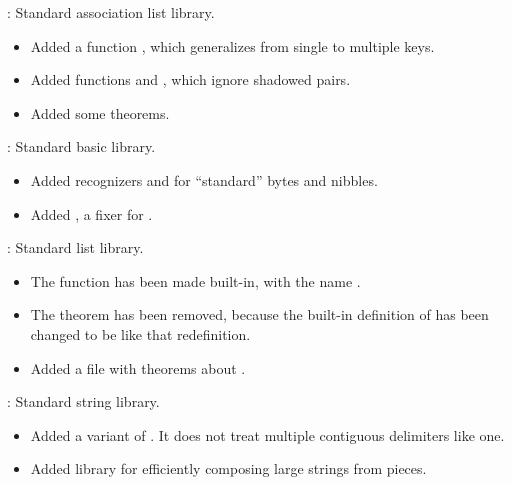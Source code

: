 \begin{frame}

\implibtitle

:
Standard association list library.
\begin{itemize}
\item
Added a function ,
which generalizes  from single to multiple keys.
\item
Added functions  and ,
which ignore shadowed pairs.
\item
Added some theorems.
\end{itemize}

\separation

:
Standard basic library.
\begin{itemize}
\item
Added recognizers  and 
for ``standard'' bytes and nibbles.
\item
Added , a fixer for .
\end{itemize}

\end{frame}


\begin{frame}

\implibtitle

:
Standard list library.
\begin{itemize}
\item
The function  has been made built-in,
with the name .
\item
The  theorem has been removed,
because the built-in definition of  has been
changed to be like that redefinition.
\item
Added a file with theorems about .
\end{itemize}

\separation

:
Standard string library.
\begin{itemize}
\item
Added a variant  of .
It does not treat multiple contiguous delimiters like one.
\item
Added  library for efficiently composing large strings from pieces.
\end{itemize}

\end{frame}

